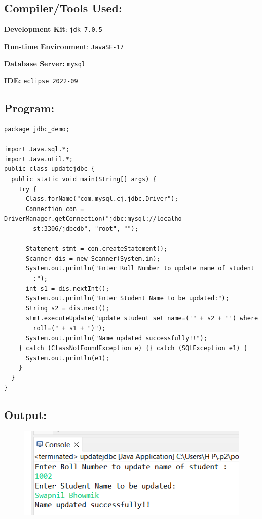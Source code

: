 \documentclass[12pt, a4paper]{article}
\begin{document}
\subsection*{Compiler/Tools Used:}
\textbf{Development Kit}: \verb+jdk-7.0.5+

\textbf{Run-time Environment}: \verb+JavaSE-17+

\textbf{Database Server:} \verb+mysql+

\textbf{IDE:} \verb+eclipse 2022-09+

\subsection*{Program:}
\begin{lstlisting}
package jdbc_demo;

import Java.sql.*;
import Java.util.*;
public class updatejdbc {
  public static void main(String[] args) {
    try {
      Class.forName("com.mysql.cj.jdbc.Driver");
      Connection con = DriverManager.getConnection("jdbc:mysql://localho
        st:3306/jdbcdb", "root", "");

      Statement stmt = con.createStatement();
      Scanner dis = new Scanner(System.in);
      System.out.println("Enter Roll Number to update name of student
        :");
      int s1 = dis.nextInt();
      System.out.println("Enter Student Name to be updated:");
      String s2 = dis.next();
      stmt.executeUpdate("update student set name=('" + s2 + "') where
        roll=(" + s1 + ")");
      System.out.println("Name updated successfully!!");
    } catch (ClassNotFoundException e) {} catch (SQLException e1) {
      System.out.println(e1);
    }
  }
}
\end{lstlisting}

\subsection*{Output:}
\begin{figure}[h]
  \centering
  \includegraphics[width=\textwidth]{ujdbc}
\end{figure}
\newpage
\end{document}
